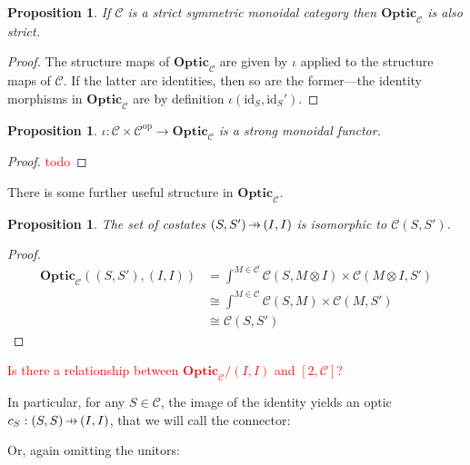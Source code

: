\documentclass[11pt,a4paper]{article}
\theoremstyle{plain}
\newtheorem{proposition}[theorem]{Proposition}
\theoremstyle{definition}
\newcommand{\C}{\mathscr{C}}
\newcommand{\Optic}{\mathbf{Optic}}
\newcommand{\id}{\mathrm{id}}
\newcommand{\op}{\mathrm{op}}
\newcommand{\hto}{\ensuremath{\,\mathaccent\shortmid\rightarrow\,}}
\newcommand{\todo}[1]{\textcolor{red}{\small #1}}
\begin{document}
\begin{proposition}
If $\C$ is a strict symmetric monoidal category then $\Optic_\C$ is also strict.
\end{proposition}
\begin{proof}
The structure maps of $\Optic_\C$ are given by $\iota$ applied to the structure maps of $\C$. If the latter are identities, then so are the former---the identity morphisms in $\Optic_\C$ are by definition $\iota(\id_S, \id_S')$.
\end{proof}

\begin{proposition}
$\iota : \C \times \C^\op \to \Optic_\C$ is a strong monoidal functor. 
\end{proposition}
\begin{proof}
\todo{todo}
\end{proof}


There is some further useful structure in $\Optic_\C$. 
\begin{proposition}
\label{prop-costates}
The set of costates $(S, S') \hto (I, I)$ is isomorphic to $\C(S, S')$.
\end{proposition}
\begin{proof}
\begin{align*}
\Optic_\C((S, S'), (I, I)) 
&= \int^{M \in \C} \C(S, M \otimes I) \times \C(M \otimes I, S') \\
&\cong \int^{M \in \C} \C(S, M) \times \C(M, S') \\
&\cong \C(S, S')
\end{align*}
\end{proof}

\todo{Is there a relationship between $\Optic_\C/(I, I)$ and $[2, \C]$?}

In particular, for any $S \in \C$, the image of the identity yields an optic $c_S : (S, S) \hto (I, I)$, that we will call the connector:
\begin{center}

\end{center}
Or, again omitting the unitors:
\begin{center}

\end{center}
\end{document}
